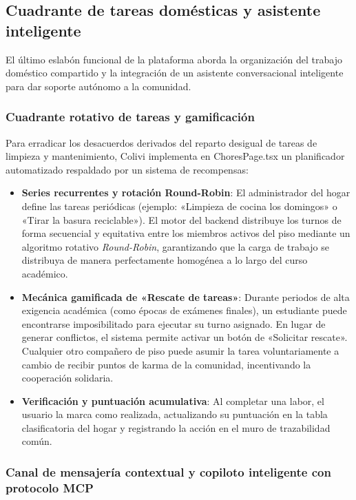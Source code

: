 \subsection{Cuadrante de tareas domésticas y asistente inteligente}
\label{subsec:tareas_asistente}

El último eslabón funcional de la plataforma aborda la organización del trabajo doméstico compartido y la integración de un asistente conversacional inteligente para dar soporte autónomo a la comunidad.

\subsubsection{Cuadrante rotativo de tareas y gamificación}

Para erradicar los desacuerdos derivados del reparto desigual de tareas de limpieza y mantenimiento, Colivi implementa en ChoresPage.tsx un planificador automatizado respaldado por un sistema de recompensas:

\begin{itemize}
    \item \textbf{Series recurrentes y rotación Round-Robin}: El administrador del hogar define las tareas periódicas (ejemplo: «Limpieza de cocina los domingos» o «Tirar la basura reciclable»). El motor del backend distribuye los turnos de forma secuencial y equitativa entre los miembros activos del piso mediante un algoritmo rotativo \emph{Round-Robin}, garantizando que la carga de trabajo se distribuya de manera perfectamente homogénea a lo largo del curso académico.
    \item \textbf{Mecánica gamificada de «Rescate de tareas»}: Durante periodos de alta exigencia académica (como épocas de exámenes finales), un estudiante puede encontrarse imposibilitado para ejecutar su turno asignado. En lugar de generar conflictos, el sistema permite activar un botón de «Solicitar rescate». Cualquier otro compañero de piso puede asumir la tarea voluntariamente a cambio de recibir puntos de karma de la comunidad, incentivando la cooperación solidaria.
    \item \textbf{Verificación y puntuación acumulativa}: Al completar una labor, el usuario la marca como realizada, actualizando su puntuación en la tabla clasificatoria del hogar y registrando la acción en el muro de trazabilidad común.
\end{itemize}

\subsubsection{Canal de mensajería contextual y copiloto inteligente con protocolo MCP}

